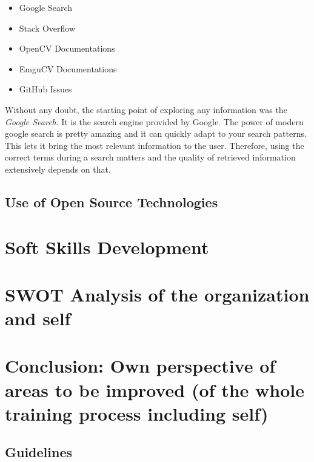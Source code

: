 \documentclass[a4paper,12pt]{report}%
\begin{document}
\begin{itemize}
	\item Google Search 
	\item Stack Overflow
	\item OpenCV Documentations
	\item EmguCV Documentations
	\item GitHub Issues
\end{itemize}

Without any doubt, the starting point of exploring any information was the \textit{Google Search}.  It is the search engine provided by Google. The power of modern google search is pretty amazing and it can quickly adapt to your search patterns. This lets it bring the most relevant information to the user. Therefore, using the correct terms during a search matters and the quality of retrieved information extensively depends on that.




\section{Use of Open Source Technologies}

\chapter{Soft Skills Development}

\chapter{SWOT Analysis of the organization and self}

\chapter{Conclusion: Own perspective of areas to be improved (of the whole training process including self)}


\begin{appendices}
	\chapter{Guidelines}
\end{appendices}

\twocolumn



\end{document}
